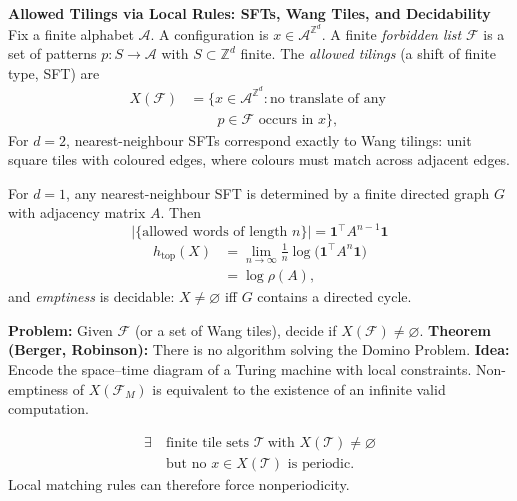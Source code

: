 \begin{technical}
{\Large\textbf{Allowed Tilings via Local Rules: SFTs, Wang Tiles, and Decidability}}\\[0.3em]

 Fix a finite alphabet $\mathcal{A}$. A configuration is $x\in\mathcal{A}^{\mathbb{Z}^d}$.  
A finite \emph{forbidden list} $\mathcal{F}$ is a set of patterns $p:S\to\mathcal{A}$ with $S\subset\mathbb{Z}^d$ finite.  
The \emph{allowed tilings} (a shift of finite type, SFT) are
\begin{align*}
X(\mathcal{F}) &= \bigl\{ x\in\mathcal{A}^{\mathbb{Z}^d} : \text{no translate of any } \\
    & \qquad p\in\mathcal{F} \text{ occurs in } x \bigr\},
\end{align*}
For $d=2$, nearest-neighbour SFTs correspond exactly to Wang tilings: unit square tiles with coloured edges, where colours must match across adjacent edges.

For $d=1$, any nearest-neighbour SFT is determined by a finite directed graph $G$ with adjacency matrix $A$. Then
\[
|\{\text{allowed words of length } n\}| = \mathbf{1}^\top A^{n-1} \mathbf{1}
\]
\vspace{0.25em}
\begin{align*}
h_{\text{top}}(X) &= \lim_{n\to\infty} \frac{1}{n} \log \bigl( \mathbf{1}^\top A^{n} \mathbf{1} \bigr) \\
    &= \log \rho(A),
\end{align*}
and \emph{emptiness} is decidable: $X\neq\varnothing$ iff $G$ contains a directed cycle.

\textbf{Problem:} Given $\mathcal{F}$ (or a set of Wang tiles), decide if $X(\mathcal{F})\neq\varnothing$.  
\textbf{Theorem (Berger, Robinson):} There is no algorithm solving the Domino Problem.  
\textbf{Idea:} Encode the space–time diagram of a Turing machine with local constraints. Non-emptiness of $X(\mathcal{F}_M)$ is equivalent to the existence of an infinite valid computation.

\begin{align*}
\exists\ &\text{finite tile sets } \mathcal{T}\ \text{with }X(\mathcal{T})\neq\varnothing \\
 &\text{but no }x\in X(\mathcal{T})\text{ is periodic}.
\end{align*}
Local matching rules can therefore force nonperiodicity.


\end{technical}
